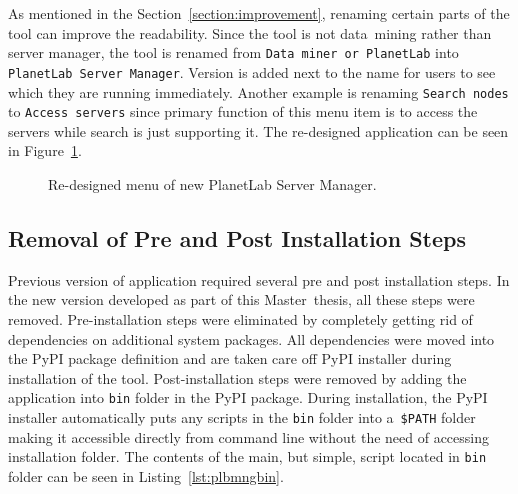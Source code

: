 {{{{As mentioned in the Section~\ref{section:improvement}, renaming certain parts of the tool can improve the readability. Since the tool is not data~mining rather than server manager, the tool is renamed from \texttt{Data~miner or PlanetLab} into \texttt{PlanetLab Server Manager}. Version is added next to the name for users to see which they are running immediately. Another example is renaming \texttt{Search nodes} to \texttt{Access servers} since primary function of this menu item is to access the servers while search is just supporting it. The re-designed application can be seen in Figure~\ref{fig:redesigned}.\\

\begin{figure}[H]
	\centering
	\caption{Re-designed menu of new PlanetLab Server Manager.}
	\label{fig:redesigned}
\end{figure}

\subsection{Removal of Pre and Post Installation Steps}
Previous version of application required several pre and post installation steps. In the new version developed as part of this Master~thesis, all these steps were removed. Pre-installation steps were eliminated by completely getting rid of dependencies on additional system packages. All dependencies were moved into the PyPI package definition and are taken care off PyPI installer during installation of the tool. Post-installation steps were removed by adding the application into \texttt{bin} folder in the PyPI package. During installation, the PyPI installer automatically puts any scripts in the \texttt{bin} folder into a~\texttt{\$PATH} folder making it accessible directly from command line without the need of accessing installation folder. The contents of the main, but simple, script located in \texttt{bin} folder can be seen in Listing~\ref{lst:plbmngbin}.

}}}}
